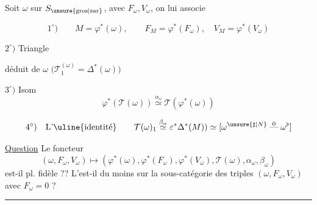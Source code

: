 Soit $\omega$ sur $S_{\unsure{\mathrm{gros}|\mathrm{zar}}}$, avec $F_\omega,V_\omega$, on lui associe

\[
1^\circ)\qquad M=\varphi^*(\omega),\qquad F_M=\varphi^*(F_\omega),\quad V_M=\varphi^*(V_\omega)
\]

$2^\circ)$ Triangle


déduit de $\omega$ $\bigl(\mathcal T_1^{(\omega)}=\Delta^*(\omega)\bigr)$

$3^\circ)$ Isom 
\[
\varphi^*(\mathcal T(\omega))\overset{\alpha_\omega}{\simeq}\mathcal T(\varphi^*(\omega))
\]

\[
4^\circ)\quad\text{L'\uline{identité}}\qquad
\mathcal T(\omega)_1\overset{\beta_\omega}{\simeq}\varepsilon^*\Delta^*(M))\simeq
[\omega^{\unsure{\sharp|N}}\mathrel{\overset{0}{\text{---}}}\omega^\flat]
\]

\uline{Question} Le foncteur
\[
(\omega,F_\omega,V_\omega)\longmapsto
(\varphi^*(\omega),\varphi^*(F_\omega),\varphi^*(V_\omega),\mathcal T(\omega),\alpha_\omega,\beta_\omega)
\]
est-il pl. fidèle ?? L'est-il du moins sur la sous-catégorie des triples $(\omega,F_\omega,V_\omega)$ avec $F_\omega=0$ ?
\par\noindent\rule{\linewidth}{0.4pt}



